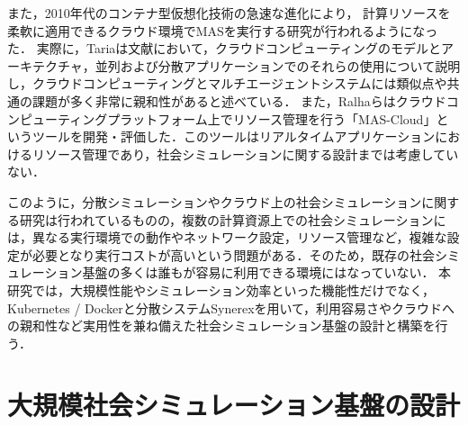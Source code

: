 \documentclass[originalpaper]{jsaiart}     %
\begin{document}
また，2010年代のコンテナ型仮想化技術の急速な進化により，
計算リソースを柔軟に適用できるクラウド環境でMASを実行する研究が行われるようになった．
実際に，Tariaは文献\cite{Talia}において，クラウドコンピューティングのモデルとアーキテクチャ，並列および分散アプリケーションでのそれらの使用について説明し，クラウドコンピューティングとマルチエージェントシステムには類似点や共通の課題が多く非常に親和性があると述べている．
また，Ralhaらはクラウドコンピューティングプラットフォーム上でリソース管理を行う「MAS-Cloud」というツールを開発・評価した\cite{Ralha}．このツールはリアルタイムアプリケーションにおけるリソース管理であり，社会シミュレーションに関する設計までは考慮していない．

このように，分散シミュレーションやクラウド上の社会シミュレーションに関する研究は行われているものの，複数の計算資源上での社会シミュレーションには，異なる実行環境での動作やネットワーク設定，リソース管理など，複雑な設定が必要となり実行コストが高いという問題がある．そのため，既存の社会シミュレーション基盤の多くは誰もが容易に利用できる環境にはなっていない．
本研究では，大規模性能やシミュレーション効率といった機能性だけでなく，Kubernetes / Dockerと分散システムSynerexを用いて，利用容易さやクラウドへの親和性など実用性を兼ね備えた社会シミュレーション基盤の設計と構築を行う．

\section{大規模社会シミュレーション基盤の設計}%

\end{document}
